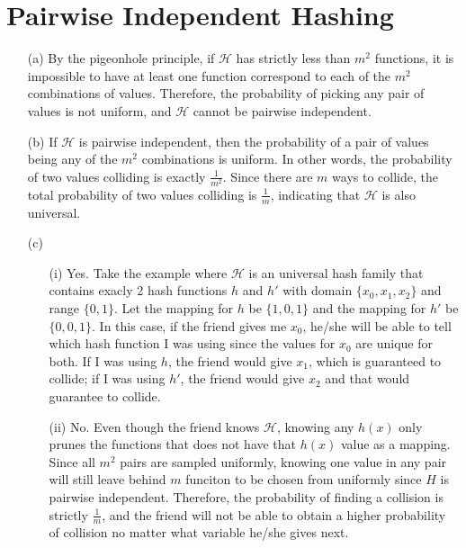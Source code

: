 \documentclass[11pt]{article}
\theoremstyle{definition}
\theoremstyle{remark}
\begin{document}
\section{Pairwise Independent Hashing}
\begin{enumerate}
\item[(a)] By the pigeonhole principle, if $\mathcal{H}$ has strictly less than $m^2$ functions, it is impossible to have at least one function correspond to each of the $m^2$ combinations of values. Therefore, the probability of picking any pair of values is not uniform, and $\mathcal{H}$ cannot be pairwise independent.

\item[(b)] If $\mathcal{H}$ is pairwise independent, then the probability of a pair of values being any of the $m^2$ combinations is uniform. In other words, the probability of two values colliding is exactly $\frac{1}{m^2}$. Since there are $m$ ways to collide, the total probability of two values colliding is $\frac{1}{m}$, indicating that $\mathcal{H}$ is also universal.

\item[(c)]
\begin{enumerate}
\item[(i)]
Yes. Take the example where $\mathcal{H}$ is an universal hash family that contains exacly 2 hash functions $h$ and $h'$ with domain $\{x_0, x_1, x_2\}$ and range $\{0,1\}$. Let the mapping for $h$ be $\{1,0,1\}$ and the mapping for $h'$ be $\{0,0,1\}$. In this case, if the friend gives me $x_0$, he/she will be able to tell which hash function I was using since the values for $x_0$ are unique for both. If I was using $h$, the friend would give $x_1$, which is guaranteed to collide; if I was using $h'$, the friend would give $x_2$ and that would guarantee to collide.

\item[(ii)]
No. Even though the friend knows $\mathcal{H}$, knowing any $h(x)$ only prunes the functions that does not have that $h(x)$ value as a mapping. Since all $m^2$ pairs are sampled uniformly, knowing one value in any pair will still leave behind $m$ funciton to be chosen from uniformly since $H$ is pairwise independent. Therefore, the probability of finding a collision is strictly $\frac{1}{m}$, and the friend will not be able to obtain a higher probability of collision no matter what variable he/she gives next.
\end{enumerate}
\end{enumerate}
\clearpage
\end{document}
